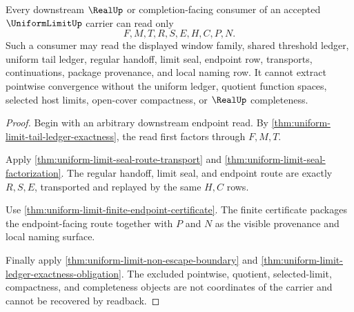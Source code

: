 \begin{theorem}
\label{thm:uniform-limit-endpoint-readback-exhaustion}
Every downstream $\RealUp$ or completion-facing consumer of an accepted $\UniformLimitUp$ carrier can read only
$$
F,M,T,R,S,E,H,C,P,N.
$$
Such a consumer may read the displayed window family, shared threshold ledger, uniform tail ledger, regular handoff, limit seal, endpoint row, transports, continuations, package provenance, and local naming row. It cannot extract pointwise convergence without the uniform ledger, quotient function spaces, selected host limits, open-cover compactness, or $\RealUp$ completeness.
\end{theorem}
\begin{proof}
Begin with an arbitrary downstream endpoint read. By \autoref{thm:uniform-limit-tail-ledger-exactness}, the read first factors through $F,M,T$.

Apply \autoref{thm:uniform-limit-seal-route-transport} and \autoref{thm:uniform-limit-seal-factorization}. The regular handoff, limit seal, and endpoint route are exactly $R,S,E$, transported and replayed by the same $H,C$ rows.

Use \autoref{thm:uniform-limit-finite-endpoint-certificate}. The finite certificate packages the endpoint-facing route together with $P$ and $N$ as the visible provenance and local naming surface.

Finally apply \autoref{thm:uniform-limit-non-escape-boundary} and \autoref{thm:uniform-limit-ledger-exactness-obligation}. The excluded pointwise, quotient, selected-limit, compactness, and completeness objects are not coordinates of the carrier and cannot be recovered by readback.
\end{proof}

